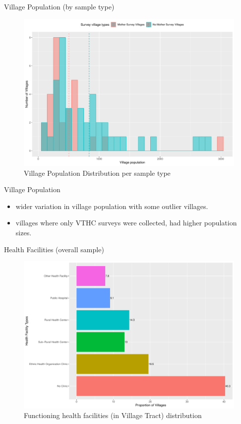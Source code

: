 \documentclass[
  ignorenonframetext,
]{beamer}
\providecommand{\tightlist}{%
  \setlength{\itemsep}{0pt}\setlength{\parskip}{0pt}}
\begin{document}
\begin{frame}{Village Population (by sample type)}
\protect\hypertarget{village-population-by-sample-type}{}
\begin{figure}
\includegraphics[width=1\linewidth]{example_plots_files/figure-beamer/unnamed-chunk-3-1} \caption{Village Population Distribution per sample type}\label{fig:unnamed-chunk-3}
\end{figure}
\end{frame}

\begin{frame}{Village Population}
\protect\hypertarget{village-population}{}
\begin{itemize}
\tightlist
\item
  wider variation in village population with some outlier villages.
\item
  villages where only VTHC surveys were collected, had higher population
  sizes.
\end{itemize}
\end{frame}

\begin{frame}{Health Facilities (overall sample)}
\protect\hypertarget{hfc}{}
\begin{figure}
\includegraphics[width=1\linewidth]{example_plots_files/figure-beamer/unnamed-chunk-4-1} \caption{Functioning health facilities (in Village Tract) distribution}\label{fig:unnamed-chunk-4}
\end{figure}
\end{frame}
\end{document}
